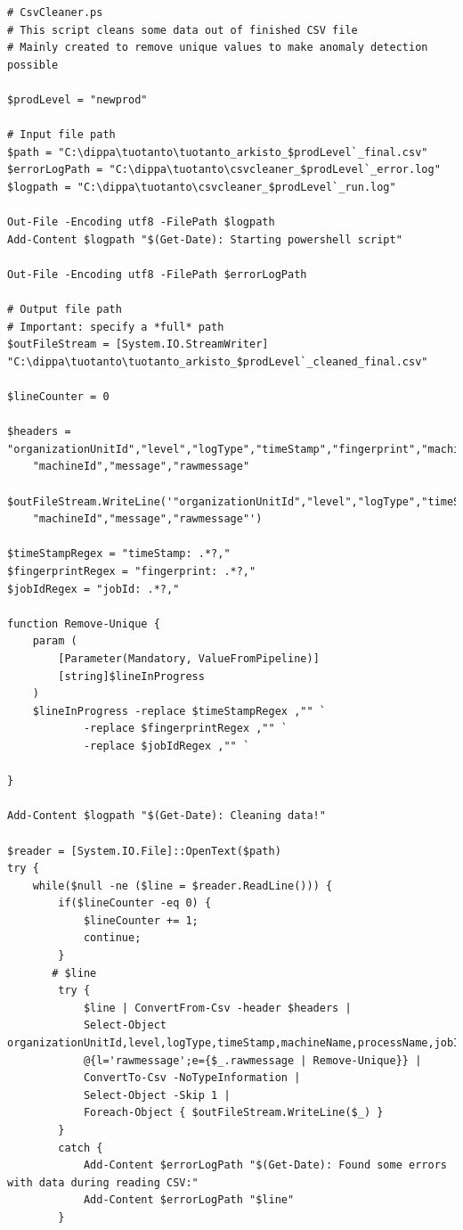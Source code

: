 \begin{Verbatim}[fontsize=\tiny]
# CsvCleaner.ps
# This script cleans some data out of finished CSV file
# Mainly created to remove unique values to make anomaly detection possible

$prodLevel = "newprod"

# Input file path
$path = "C:\dippa\tuotanto\tuotanto_arkisto_$prodLevel`_final.csv"
$errorLogPath = "C:\dippa\tuotanto\csvcleaner_$prodLevel`_error.log"
$logpath = "C:\dippa\tuotanto\csvcleaner_$prodLevel`_run.log"

Out-File -Encoding utf8 -FilePath $logpath
Add-Content $logpath "$(Get-Date): Starting powershell script"

Out-File -Encoding utf8 -FilePath $errorLogPath

# Output file path
# Important: specify a *full* path
$outFileStream = [System.IO.StreamWriter] "C:\dippa\tuotanto\tuotanto_arkisto_$prodLevel`_cleaned_final.csv"

$lineCounter = 0

$headers = "organizationUnitId","level","logType","timeStamp","fingerprint","machineName","processName","jobId","robotName",
    "machineId","message","rawmessage"

$outFileStream.WriteLine('"organizationUnitId","level","logType","timeStamp","machineName","processName","jobId","robotName",
    "machineId","message","rawmessage"')

$timeStampRegex = "timeStamp: .*?,"
$fingerprintRegex = "fingerprint: .*?,"
$jobIdRegex = "jobId: .*?,"

function Remove-Unique {
    param (
        [Parameter(Mandatory, ValueFromPipeline)]
        [string]$lineInProgress
    )
    $lineInProgress -replace $timeStampRegex ,"" `
            -replace $fingerprintRegex ,"" `
            -replace $jobIdRegex ,"" `

}

Add-Content $logpath "$(Get-Date): Cleaning data!"

$reader = [System.IO.File]::OpenText($path)
try {
    while($null -ne ($line = $reader.ReadLine())) {
        if($lineCounter -eq 0) {
            $lineCounter += 1;
            continue;
        }
       # $line
        try {
            $line | ConvertFrom-Csv -header $headers |
            Select-Object organizationUnitId,level,logType,timeStamp,machineName,processName,jobId,robotName,machineId,message,
            @{l='rawmessage';e={$_.rawmessage | Remove-Unique}} |
            ConvertTo-Csv -NoTypeInformation |
            Select-Object -Skip 1 |
            Foreach-Object { $outFileStream.WriteLine($_) }
        }
        catch {
            Add-Content $errorLogPath "$(Get-Date): Found some errors with data during reading CSV:"
            Add-Content $errorLogPath "$line"
        }


\end{Verbatim}
